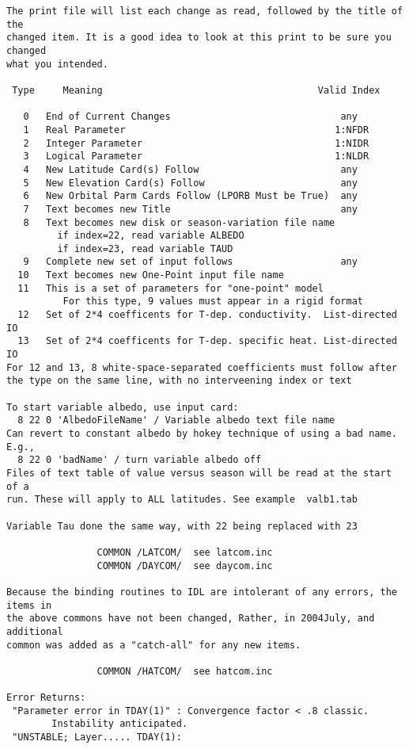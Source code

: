 \begin{verbatim}
The print file will list each change as read, followed by the title of the
changed item. It is a good idea to look at this print to be sure you changed
what you intended.

 Type     Meaning                                      Valid Index

   0   End of Current Changes                              any
   1   Real Parameter                                     1:NFDR
   2   Integer Parameter                                  1:NIDR
   3   Logical Parameter                                  1:NLDR
   4   New Latitude Card(s) Follow                         any
   5   New Elevation Card(s) Follow                        any
   6   New Orbital Parm Cards Follow (LPORB Must be True)  any
   7   Text becomes new Title                              any
   8   Text becomes new disk or season-variation file name
         if index=22, read variable ALBEDO
         if index=23, read variable TAUD
   9   Complete new set of input follows                   any
  10   Text becomes new One-Point input file name
  11   This is a set of parameters for "one-point" model 
          For this type, 9 values must appear in a rigid format
  12   Set of 2*4 coefficents for T-dep. conductivity.  List-directed IO
  13   Set of 2*4 coefficents for T-dep. specific heat. List-directed IO 
For 12 and 13, 8 white-space-separated coefficients must follow after 
the type on the same line, with no interveening index or text 

To start variable albedo, use input card: 
  8 22 0 'AlbedoFileName' / Variable albedo text file name
Can revert to constant albedo by hokey technique of using a bad name. E.g.,
  8 22 0 'badName' / turn variable albedo off
Files of text table of value versus season will be read at the start of a
run. These will apply to ALL latitudes. See example  valb1.tab
 
Variable Tau done the same way, with 22 being replaced with 23

                COMMON /LATCOM/  see latcom.inc
                COMMON /DAYCOM/  see daycom.inc

Because the binding routines to IDL are intolerant of any errors, the items in
the above commons have not been changed, Rather, in 2004July, and additional
common was added as a "catch-all" for any new items.

                COMMON /HATCOM/  see hatcom.inc

Error Returns:
 "Parameter error in TDAY(1)" : Convergence factor < .8 classic. 
        Instability anticipated.  
 "UNSTABLE; Layer..... TDAY(1): 



\end{verbatim}
